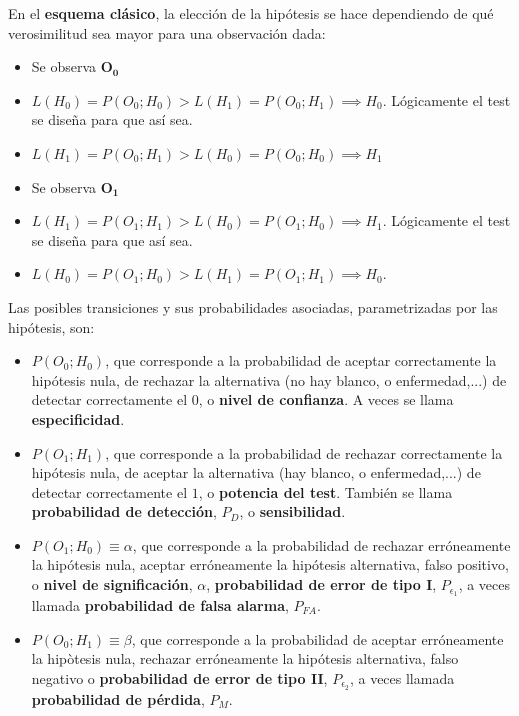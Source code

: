 \documentclass[11pt]{article}
\providecommand{\tightlist}{%
      \setlength{\itemsep}{0pt}\setlength{\parskip}{0pt}}
\begin{document}
    En el \textbf{esquema clásico}, la elección de la hipótesis se hace
dependiendo de qué verosimilitud sea mayor para una observación dada:

\begin{itemize}
\tightlist
\item
  Se observa \(\mathbf{O_0}\)
\item
  \(L(H_0) = P(O_0;H_0) > L(H_1) = P(O_0;H_1) \implies H_0\).
  Lógicamente el test se diseña para que así sea.
\item
  \(L(H_1) = P(O_0;H_1) > L(H_0) = P(O_0;H_0) \implies H_1\)
\item
  Se observa \(\mathbf{O_1}\)
\item
  \(L(H_1) = P(O_1;H_1) > L(H_0) = P(O_1;H_0) \implies H_1\).
  Lógicamente el test se diseña para que así sea.
\item
  \(L(H_0) = P(O_1;H_0) > L(H_1) = P(O_1;H_1) \implies H_0\).
\end{itemize}

    Las posibles transiciones y sus probabilidades asociadas, parametrizadas
por las hipótesis, son: 
\begin{itemize}
\item \(P(O_0;H_0)\), que corresponde a la
probabilidad de aceptar correctamente la hipótesis nula, de rechazar la
alternativa (no hay blanco, o enfermedad,...) de detectar correctamente
el \(0\), o \textbf{nivel de confianza}. A veces se llama
\textbf{especificidad}. 
\item \(P(O_1;H_1)\), que corresponde a la
probabilidad de rechazar correctamente la hipótesis nula, de aceptar la
alternativa (hay blanco, o enfermedad,...) de detectar correctamente el
\(1\), o \textbf{potencia del test}. También se llama
\textbf{probabilidad de detección}, \(P_D\), o \textbf{sensibilidad}.
\item \(P(O_1;H_0)\equiv\alpha\), que corresponde a la probabilidad de
rechazar erróneamente la hipótesis nula, aceptar erróneamente la
hipótesis alternativa, falso positivo, o \textbf{nivel de
significación}, \(\alpha\), \textbf{probabilidad de error de tipo I},
\(P_{\epsilon_1}\), a veces llamada \textbf{probabilidad de falsa
alarma}, \(P_{FA}\). 
\item \(P(O_0;H_1)\equiv\beta\), que corresponde a la
probabilidad de aceptar erróneamente la hipòtesis nula, rechazar
erróneamente la hipótesis alternativa, falso negativo o
\textbf{probabilidad de error de tipo II}, \(P_{\epsilon_2}\), a veces
llamada \textbf{probabilidad de pérdida}, \(P_{M}\).
\end{itemize}
\end{document}
